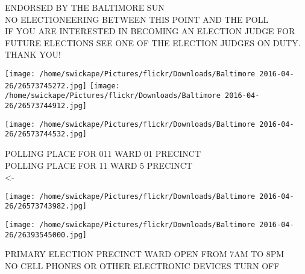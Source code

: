 \documentclass[10pt,letterpaper]{article}
\begin{document}
ENDORSED BY THE BALTIMORE SUN\\
NO ELECTIONEERING BETWEEN THIS POINT AND THE POLL\\
IF YOU ARE INTERESTED IN BECOMING AN ELECTION JUDGE FOR FUTURE ELECTIONS SEE ONE OF THE ELECTION JUDGES ON DUTY.  THANK YOU!\\
\pagebreak

\texttt{[image: /home/swickape/Pictures/flickr/Downloads/Baltimore 2016-04-26/26573745272.jpg]}
\texttt{[image: /home/swickape/Pictures/flickr/Downloads/Baltimore 2016-04-26/26573744912.jpg]}

\texttt{[image: /home/swickape/Pictures/flickr/Downloads/Baltimore 2016-04-26/26573744532.jpg]}

POLLING PLACE FOR 011 WARD 01 PRECINCT\\
POLLING PLACE FOR 11 WARD 5 PRECINCT\\
<{-}\\
\pagebreak

\texttt{[image: /home/swickape/Pictures/flickr/Downloads/Baltimore 2016-04-26/26573743982.jpg]}

\vspace{0.25in}
\texttt{[image: /home/swickape/Pictures/flickr/Downloads/Baltimore 2016-04-26/26393545000.jpg]}

PRIMARY ELECTION PRECINCT WARD OPEN FROM 7AM TO 8PM\\
NO CELL PHONES OR OTHER ELECTRONIC DEVICES TURN OFF\\
\pagebreak
\end{document}
